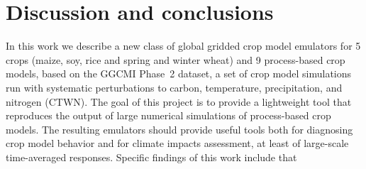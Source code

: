 \documentclass[gmdd]{copernicus} %
\begin{document}
\section{Discussion and conclusions} 
\label{S:6}
In this work we describe a new class of global gridded crop model emulators for 5 crops (maize, soy, rice and spring and winter wheat) and 9 process-based crop models, based on the GGCMI Phase~2 dataset, a set of crop model simulations run with systematic perturbations to carbon, temperature, precipitation, and nitrogen (CTWN). The goal of this project is to provide a lightweight tool that reproduces the output of large numerical simulations of process-based crop models. The resulting emulators should provide useful tools both for diagnosing crop model behavior and for climate impacts assessment, at least of large-scale time-averaged responses.
Specific findings of this work include that
\end{document}
